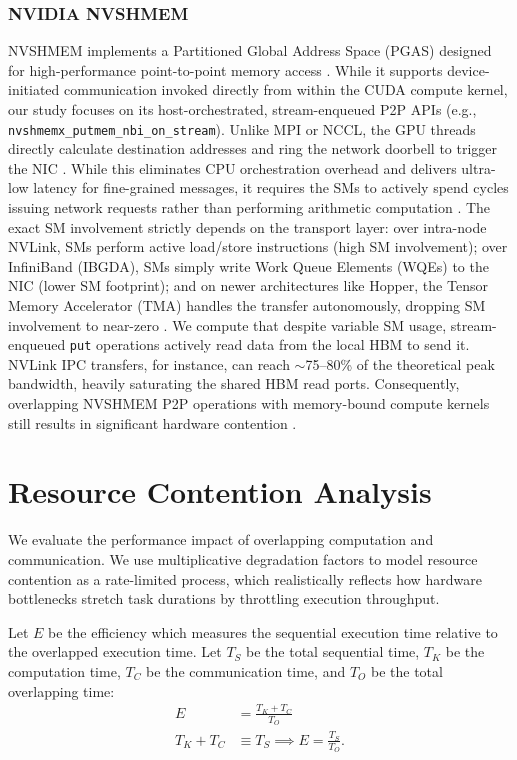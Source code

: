 \documentclass[twocolumn, secnumarabic, amssymb, nobibnotes, aps, prd, amsmath, nofootinbib]{revtex4-2}
\begin{document}
\subsubsection{NVIDIA NVSHMEM}
NVSHMEM implements a Partitioned Global Address Space (PGAS) designed for high-performance point-to-point memory access \cite{nvidia_nvshmem_doc}. While it supports device-initiated communication invoked directly from within the CUDA compute kernel, our study focuses on its host-orchestrated, stream-enqueued P2P APIs (e.g., \texttt{nvshmemx\_putmem\_nbi\_on\_stream}). Unlike MPI or NCCL, the GPU threads directly calculate destination addresses and ring the network doorbell to trigger the NIC \cite{unat2024landscape}. While this eliminates CPU orchestration overhead and delivers ultra-low latency for fine-grained messages, it requires the SMs to actively spend cycles issuing network requests rather than performing arithmetic computation \cite{hwang2023ark}. The exact SM involvement strictly depends on the transport layer: over intra-node NVLink, SMs perform active load/store instructions (high SM involvement); over InfiniBand (IBGDA), SMs simply write Work Queue Elements (WQEs) to the NIC (lower SM footprint); and on newer architectures like Hopper, the Tensor Memory Accelerator (TMA) handles the transfer autonomously, dropping SM involvement to near-zero \cite{nvidia_hopper_tma}. We compute that despite variable SM usage, stream-enqueued \texttt{put} operations actively read data from the local HBM to send it. NVLink IPC transfers, for instance, can reach $\sim$75--80\% of the theoretical peak bandwidth, heavily saturating the shared HBM read ports. Consequently, overlapping NVSHMEM P2P operations with memory-bound compute kernels still results in significant hardware contention \cite{nvidia_nvshmem_doc}.

\section{Resource Contention Analysis} \label{sect:contention-analysis}

We evaluate the performance impact of overlapping computation and communication. We use multiplicative degradation factors to model resource contention as a rate-limited process, which realistically reflects how hardware bottlenecks stretch task durations by throttling execution throughput.

Let $E$ be the efficiency which measures the sequential execution time relative to the overlapped execution time. Let $T_S$ be the total sequential time, $T_K$ be the computation time, $T_C$ be the communication time, and $T_O$ be the total overlapping time:
\begin{align*}
    E &= \frac{T_K + T_C}{T_O} \\
    T_K + T_C &\equiv T_S \implies E = \frac{T_S}{T_O}.
\end{align*}
\end{document}
